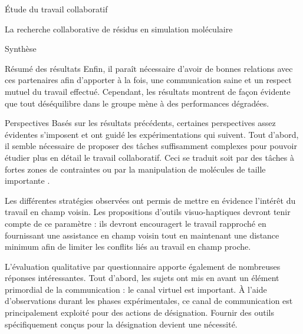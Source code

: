\documentclass[myfrancais]{mythesis}
\begin{document}
\begin{mypart}{Étude du travail collaboratif}
\begin{mychapter}{La recherche collaborative de résidus en simulation moléculaire}
\begin{mysection}{Synthèse}
\begin{mysubsection}{Résumé des résultats}
					Enfin, il paraît nécessaire d'avoir de bonnes relations avec ces partenaires afin d'apporter à la fois, une communication saine et un respect mutuel du travail effectué.
					Cependant, les résultats montrent de façon évidente que tout déséquilibre dans le groupe mène à des performances dégradées.
				\end{mysubsection}
				\begin{mysubsection}{Perspectives}
					Basés sur les résultats précédents, certaines perspectives assez évidentes s'imposent et ont guidé les expérimentations qui suivent.
					Tout d'abord, il semble nécessaire de proposer des tâches suffisamment complexes pour pouvoir étudier plus en détail le travail collaboratif.
					Ceci se traduit soit par des tâches à fortes zones de contraintes  ou par la manipulation de molécules de taille importante .

					Les différentes stratégies observées ont permis de mettre en évidence l'intérêt du travail en champ voisin.
					Les propositions d'outils visuo-haptiques devront tenir compte de ce paramètre : ils devront encouragert le travail rapproché en fournissant une assistance en champ voisin tout en maintenant une distance minimum afin de limiter les conflits liés au travail en champ proche.

					L'évaluation qualitative par questionnaire apporte également de nombreuses réponses intéressantes.
					Tout d'abord, les sujets ont mis en avant un élément primordial de la communication : le canal virtuel est important.
					À l'aide d'observations durant les phases expérimentales, ce canal de communication est principalement exploité pour des actions de désignation.
					Fournir des outils spécifiquement conçus pour la désignation devient une nécessité.


\end{mysubsection}
\end{mysection}
\end{mychapter}
\end{mypart}
\end{document}
